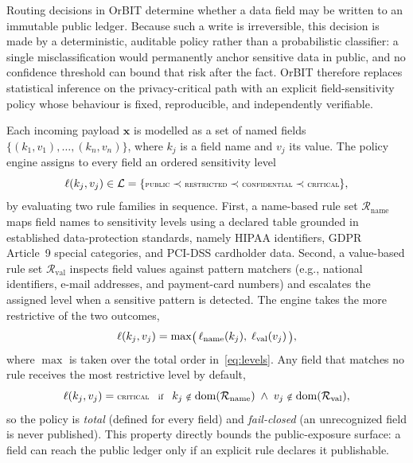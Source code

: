 \documentclass[final,5p,times,twocolumn]{elsarticle}
\begin{document}
Routing decisions in OrBIT determine whether a data field may be written to an immutable public ledger. Because such a write is irreversible, this decision is made by a deterministic, auditable policy rather than a probabilistic classifier: a single misclassification would permanently anchor sensitive data in public, and no confidence threshold can bound that risk after the fact. OrBIT therefore replaces statistical inference on the privacy-critical path with an explicit field-sensitivity policy whose behaviour is fixed, reproducible, and independently verifiable.

Each incoming payload $\mathbf{x}$ is modelled as a set of named fields $\{(k_1,v_1),\ldots,(k_n,v_n)\}$, where $k_j$ is a field name and $v_j$ its value. The policy engine assigns to every field an ordered sensitivity level
\begin{equation}
\scriptsize
  \ell(k_j,v_j)\in\mathcal{L}=\{\textsc{public}\prec\textsc{restricted}\prec\textsc{confidential}\prec\textsc{critical}\},
  \label{eq:levels}
\end{equation}
by evaluating two rule families in sequence. First, a name-based rule set $\mathcal{R}_{\mathrm{name}}$ maps field names to sensitivity levels using a declared table grounded in established data-protection standards, namely HIPAA identifiers, GDPR Article~9 special categories, and PCI-DSS cardholder data. Second, a value-based rule set $\mathcal{R}_{\mathrm{val}}$ inspects field values against pattern matchers (e.g., national identifiers, e-mail addresses, and payment-card numbers) and escalates the assigned level when a sensitive pattern is detected. The engine takes the more restrictive of the two outcomes,
\begin{equation}
\scriptsize
  \ell(k_j,v_j)
  = \max\!\big(\,\ell_{\mathrm{name}}(k_j),\ \ell_{\mathrm{val}}(v_j)\,\big),
  \label{eq:escalation}
\end{equation}
where $\max$ is taken over the total order in~\eqref{eq:levels}. Any field that matches no rule receives the most restrictive level by default,
\begin{equation}
\scriptsize
  \ell(k_j,v_j)=\textsc{critical}
  \quad\text{if}\quad
  k_j\notin\mathrm{dom}(\mathcal{R}_{\mathrm{name}})
  \ \wedge\
  v_j\notin\mathrm{dom}(\mathcal{R}_{\mathrm{val}}),
  \label{eq:failclosed}
\end{equation}
so the policy is \emph{total} (defined for every field) and \emph{fail-closed} (an unrecognized field is never published). This property directly bounds the public-exposure surface: a field can reach the public ledger only if an explicit rule declares it publishable.
\end{document}
